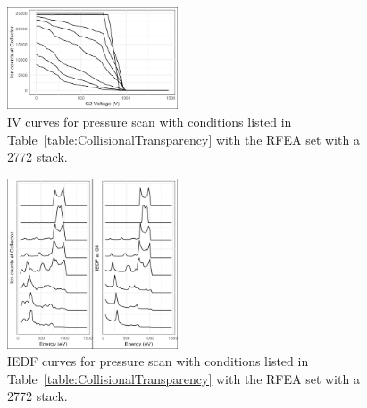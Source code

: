 \begin{figure}[htbp]
\centering
\includegraphics[width=0.45\textwidth]{Figures/IVcurve2772.jpeg}
\caption{IV curves for pressure scan with conditions listed in Table~\ref{table:CollisionalTransparency} with the RFEA set with a 2772 stack.}
\label{fig:IVcurves2772}
\end{figure}

\begin{figure}[htbp]
\centering
\includegraphics[width=0.45\textwidth]{Figures/PressureScan2772.jpeg}
\caption{IEDF curves for pressure scan with conditions listed in Table~\ref{table:CollisionalTransparency} with the RFEA set with a 2772 stack.}
\label{fig:PressureScan2772}
\end{figure}
